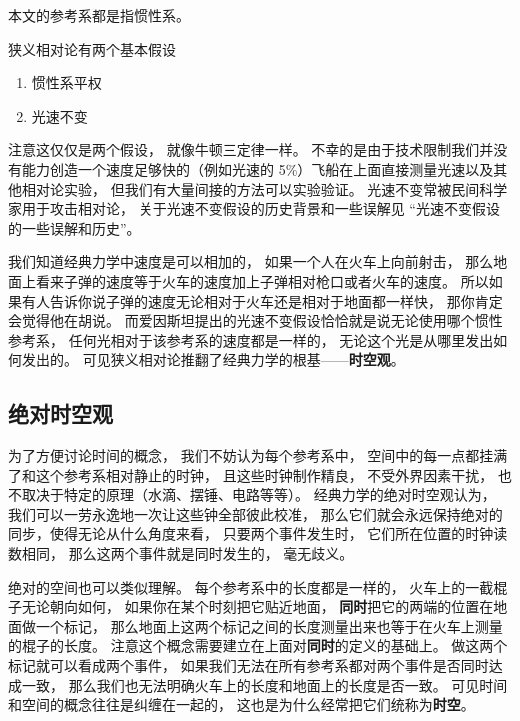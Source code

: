 
\begin{issues}
\issueDraft
\end{issues}


本文的参考系都是指惯性系。

狭义相对论有两个基本假设
\begin{enumerate}
\item 惯性系平权
\item 光速不变
\end{enumerate}

注意这仅仅是两个假设， 就像牛顿三定律一样。 不幸的是由于技术限制我们并没有能力创造一个速度足够快的（例如光速的 5\%）飞船在上面直接测量光速以及其他相对论实验， 但我们有大量间接的方法可以实验验证。 光速不变常被民间科学家用于攻击相对论， 关于光速不变假设的历史背景和一些误解见 “光速不变假设的一些误解和历史”。

我们知道经典力学中速度是可以相加的， 如果一个人在火车上向前射击， 那么地面上看来子弹的速度等于火车的速度加上子弹相对枪口或者火车的速度。 所以如果有人告诉你说子弹的速度无论相对于火车还是相对于地面都一样快， 那你肯定会觉得他在胡说。 而爱因斯坦提出的光速不变假设恰恰就是说无论使用哪个惯性参考系， 任何光相对于该参考系的速度都是一样的， 无论这个光是从哪里发出如何发出的。 可见狭义相对论推翻了经典力学的根基——\textbf{时空观}。

\subsection{绝对时空观}\label{sub_Relat0_1}
为了方便讨论时间的概念， 我们不妨认为每个参考系中， 空间中的每一点都挂满了和这个参考系相对静止的时钟， 且这些时钟制作精良， 不受外界因素干扰， 也不取决于特定的原理（水滴、摆锤、电路等等）。 经典力学的绝对时空观认为， 我们可以一劳永逸地一次让这些钟全部彼此校准， 那么它们就会永远保持绝对的同步，使得无论从什么角度来看， 只要两个事件发生时， 它们所在位置的时钟读数相同， 那么这两个事件就是同时发生的， 毫无歧义。

绝对的空间也可以类似理解。 每个参考系中的长度都是一样的， 火车上的一截棍子无论朝向如何， 如果你在某个时刻把它贴近地面， \textbf{同时}把它的两端的位置在地面做一个标记， 那么地面上这两个标记之间的长度测量出来也等于在火车上测量的棍子的长度。 注意这个概念需要建立在上面对\textbf{同时}的定义的基础上。 做这两个标记就可以看成两个事件， 如果我们无法在所有参考系都对两个事件是否同时达成一致， 那么我们也无法明确火车上的长度和地面上的长度是否一致。 可见时间和空间的概念往往是纠缠在一起的， 这也是为什么经常把它们统称为\textbf{时空}。

